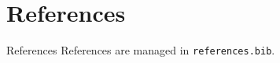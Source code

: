 \documentclass[
  ignorenonframetext,
]{beamer}
\author{\texorpdfstring{}{}}
\date{}
\begin{document}
\section{References}\label{references}

\begin{frame}{References}
References are managed in \texttt{references.bib}.
\end{frame}
\end{document}
